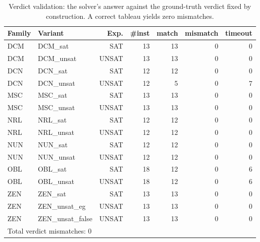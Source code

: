 \begin{table}[t]\centering
\caption{Verdict validation: the solver's answer against the ground-truth verdict fixed by construction. A correct tableau yields zero mismatches.}
\label{tab:bench-verdict-validation}
\small
\begin{tabular}{llrrrrr}
\toprule
Family & Variant & Exp. & \#inst & match & mismatch & timeout \\
\midrule
DCM & DCM\_sat & SAT & 13 & 13 & 0 & 0 \\
DCM & DCM\_unsat & UNSAT & 13 & 13 & 0 & 0 \\
DCN & DCN\_sat & SAT & 12 & 12 & 0 & 0 \\
DCN & DCN\_unsat & UNSAT & 12 & 5 & 0 & 7 \\
MSC & MSC\_sat & SAT & 13 & 13 & 0 & 0 \\
MSC & MSC\_unsat & UNSAT & 13 & 13 & 0 & 0 \\
NRL & NRL\_sat & SAT & 12 & 12 & 0 & 0 \\
NRL & NRL\_unsat & UNSAT & 12 & 12 & 0 & 0 \\
NUN & NUN\_sat & SAT & 12 & 12 & 0 & 0 \\
NUN & NUN\_unsat & UNSAT & 12 & 12 & 0 & 0 \\
OBL & OBL\_sat & SAT & 18 & 12 & 0 & 6 \\
OBL & OBL\_unsat & UNSAT & 18 & 12 & 0 & 6 \\
ZEN & ZEN\_sat & SAT & 13 & 13 & 0 & 0 \\
ZEN & ZEN\_unsat\_eg & UNSAT & 13 & 13 & 0 & 0 \\
ZEN & ZEN\_unsat\_false & UNSAT & 13 & 13 & 0 & 0 \\
\midrule
\multicolumn{7}{l}{Total verdict mismatches: 0} \\
\bottomrule
\end{tabular}
\end{table}
